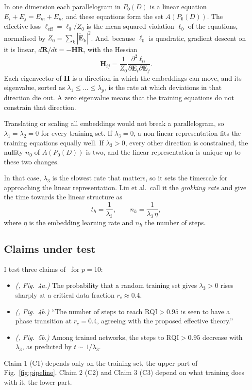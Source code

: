 In one dimension each parallelogram in $P_0(D)$ is a linear equation
$E_i + E_j = E_m + E_n$, and these equations form the set $A(P_0(D))$. The effective loss $\ell_{\mathrm{eff}} = \ell_0/Z_0$ is the mean
squared violation $\ell_0$ of the equations, normalised by
$Z_0 = \sum_k |\tilde{\mathbf{E}}_k|^2$. And, because $\ell_0$ is quadratic,
gradient descent on it is linear, $d\mathbf{R}/dt = -\mathbf{H}\mathbf{R}$,
with the Hessian
%
\begin{equation}
  \mathbf{H}_{ij} = \frac{1}{Z_0}
    \frac{\partial^2 \ell_0}{\partial \mathbf{E}_i \partial \mathbf{E}_j}.
  \label{eq:hessian}
\end{equation}
%
Each eigenvector of $\mathbf{H}$ is a direction in which the embeddings can
move, and its eigenvalue, sorted as $\lambda_1 \le \dots \le \lambda_p$, is
the rate at which deviations in that direction die out. A zero eigenvalue means
that the training equations do not constrain that direction.

Translating or scaling all embeddings would not break a parallelogram, so
$\lambda_1 = \lambda_2 = 0$ for every training set. If
$\lambda_3 = 0$, a non-linear representation fits the training equations equally
well. If $\lambda_3 > 0$, every other direction is constrained, the nullity
$n_0$ of $A(P_0(D))$ is two, and the linear representation is unique up to
these two changes.

In that case, $\lambda_3$ is the slowest rate that matters, so it sets the timescale for
approaching the linear representation. Liu et al.\ call it the
\emph{grokking rate} and give the time towards the linear structure as
%
\begin{equation}
  t_h = \frac{1}{\lambda_3}, \qquad n_h = \frac{1}{\lambda_3\, \eta},
  \label{eq:grokrate}
\end{equation}
%
where $\eta$ is the embedding learning rate and $n_h$ the number of steps.

\subsection{Claims under test}
\label{sec:claims}

I test three claims of~\cite{liu2022grokking} for $p = 10$:
%
\begin{itemize}
  \item[\textbf{C1}] \emph{(\cite{liu2022grokking}, Fig.~4a.)} The probability that a random training
    set gives $\lambda_3 > 0$ rises sharply at a critical data fraction
    $r_c \approx 0.4$.
  \item[\textbf{C2}] \emph{(\cite{liu2022grokking}, Fig.~4b.)} ``The number of steps to reach
    $\mathrm{RQI} > 0.95$ is seen to have a phase transition at $r_c = 0.4$,
    agreeing with the proposed effective theory.''
  \item[\textbf{C3}] \emph{(\cite{liu2022grokking}, Fig.~5b.)} Among trained networks, the steps to
    $\mathrm{RQI} > 0.95$ decrease with $\lambda_3$, as predicted by
    $t \sim 1/\lambda_3$.
\end{itemize}
%
Claim 1 (C1) depends only on the training set, the upper part of
Fig.~\ref{fig:pipeline}. Claim 2 (C2) and Claim 3 (C3) depend on what training does with it, the
lower part.
